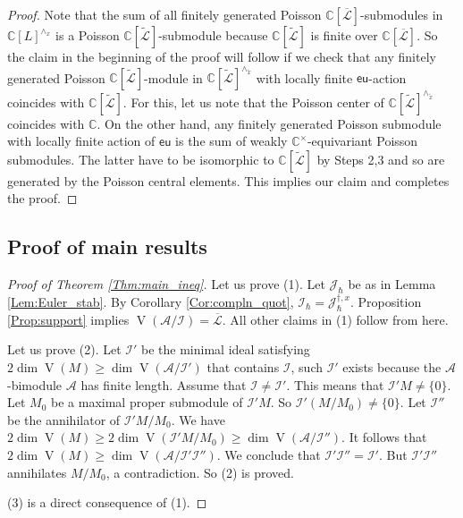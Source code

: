 \documentclass[12pt]{amsart}
\newcommand{\A}{\mathcal{A}}
\newcommand{\I}{\mathcal{I}}
\newcommand{\VA}{\operatorname{V}}
\newcommand{\C}{\mathbb{C}}
\newcommand{\J}{\mathcal{J}}
\newcommand{\Leaf}{\mathcal{L}}
\theoremstyle{definition}
\begin{document}
\begin{proof}
Note that the sum of all finitely generated Poisson $\C[\overline{\mathcal{L}}]$-submodules
in $\C[L]^{\wedge_x}$ is a Poisson $\C[\widetilde{\mathcal{L}}]$-submodule because $\C[\widetilde{\mathcal{L}}]$
is finite over $\C[\overline{\mathcal{L}}]$.
 So the claim in the beginning
of the proof will follow if we check that any finitely generated Poisson $\C[\widetilde{\Leaf}]$-module in
$\C[\widetilde{\Leaf}]^{\wedge_{\tilde{x}}}$ with locally finite $\mathsf{eu}$-action coincides with
$\C[\widetilde{\Leaf}]$. For this, let us note that the Poisson center of $\C[\widetilde{\Leaf}]^{\wedge_{\tilde{x}}}$
coincides with $\C$. On the other hand, any finitely generated Poisson submodule with locally finite
action of $\mathsf{eu}$ is the sum of  weakly $\C^\times$-equivariant Poisson submodules. The latter
have to be isomorphic to $\C[\widetilde{\Leaf}]$ by Steps 2,3
and so are generated by the Poisson central elements. This implies our claim and completes the proof.
\end{proof}


\subsection{Proof of main results}
\begin{proof}[Proof of Theorem \ref{Thm:main_ineq}]
Let us prove (1). Let $\J_\hbar$ be as in Lemma \ref{Lem:Euler_stab}. By Corollary \ref{Cor:compln_quot},
$\I_\hbar=\J_\hbar^{\dagger,x}$. Proposition \ref{Prop:support} implies $\VA(\A/\I)=\overline{\mathcal{L}}$.
All other claims in (1) follow from here.

Let us prove (2).
Let $\I'$ be the minimal ideal satisfying $2\dim \VA(M)\geqslant \dim \VA(\A/\I')$ that contains
$\I$, such $\I'$ exists because the $\A$-bimodule $\A$ has finite length. Assume that $\I\neq \I'$. This means
that $\I' M\neq \{0\}$. Let $M_0$ be a maximal proper submodule of $\I' M$. So $\I'(M/M_0)\neq \{0\}$.
Let $\I''$ be the annihilator of $\I' M/M_0$. We have
$2\dim \VA(M)\geqslant 2\dim \VA(\I' M/M_0)\geqslant \dim \VA(\A/\I'')$. It follows that
$2\dim \VA(M)\geqslant \dim \VA(\A/\I'\I'')$. We conclude that $\I'\I''=\I'$. But $\I'\I''$
annihilates $M/M_0$, a contradiction. So (2) is proved.

(3) is a direct consequence of (1).
\end{proof}
\end{document}
